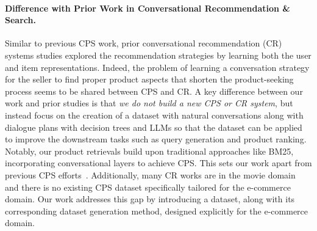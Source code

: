 \paragraph{Difference with Prior Work in Conversational Recommendation \& Search.}
Similar to previous CPS work, prior conversational recommendation (CR) systems studies \cite{li2018towards, hayati2020inspired, liu2020towards, liu2021durecdial, deng2021unified, zhang2022multiple} explored the recommendation strategies by learning both the user and item representations. Indeed, the problem of learning a conversation strategy for the seller to find proper product aspects that shorten the product-seeking process seems to be shared between CPS and CR.
A key difference between our work and prior studies is that \textit{we do not build a new CPS or CR system}, but instead focus on the creation of a dataset with natural conversations along with dialogue plans with decision trees and LLMs so that the dataset can be applied to improve the downstream tasks such as query generation and product ranking. Notably, our product retrievals build upon traditional approaches like BM25, incorporating conversational layers to achieve CPS. This sets our work apart from previous CPS efforts~\cite{zhang2018towards,bi2019conversational,zou2022learning}. Additionally, many CR works are in the movie domain \cite{li2018towards, hayati2020inspired, liu2020towards, liu2021durecdial} and there is no existing CPS dataset specifically tailored for the e-commerce domain. Our work addresses this gap by introducing a dataset, along with its corresponding dataset generation method, designed explicitly for the e-commerce domain.
